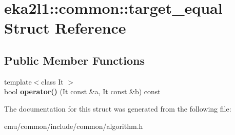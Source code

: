 \hypertarget{structeka2l1_1_1common_1_1target__equal}{}\section{eka2l1\+:\+:common\+:\+:target\+\_\+equal Struct Reference}
\label{structeka2l1_1_1common_1_1target__equal}
\subsection*{Public Member Functions}
\begin{DoxyCompactItemize}
\item 
\mbox{\label{structeka2l1_1_1common_1_1target__equal_a1c02004d3a2749b8eb4f3edcee4a119b}} 
{\footnotesize template$<$class It $>$ }\\bool {\bfseries operator()} (It const \&a, It const \&b) const
\end{DoxyCompactItemize}


The documentation for this struct was generated from the following file\+:\begin{DoxyCompactItemize}
\item 
emu/common/include/common/algorithm.\+h\end{DoxyCompactItemize}
